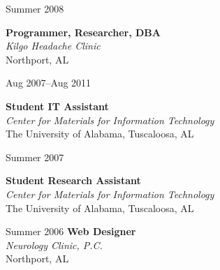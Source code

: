\documentclass[11pt]{simplecv}
\newcommand{\stitle}{\textbf}
\newcommand{\splace}{\textit}
\newif\ifcv
\begin{document}
\begin{topic}
{\ifcv
	\begin{itemize}
		\item Organized weeklong game development workshop.
	\end{itemize}
\fi
}


\item[Summer 2008] {  
  \stitle{Programmer, Researcher, DBA} \\
  \splace{Kilgo Headache Clinic} \\
  Northport, AL

\ifcv
  \begin{itemize}
    \item Managed MySQL database for research data.
    \item Created Java-based data entry client.
    \item Performed data entry.
  \end{itemize}
\fi
}

\item[Aug 2007--Aug 2011] {
  \stitle{Student IT Assistant} \\
  \splace{Center for Materials for Information Technology} \\
  The University of Alabama, Tuscaloosa, AL

\ifcv
  \begin{itemize}
    \item Managed Linux-based services.
    \item Created software solutions for IT problems.
    \item Improved many processes.
  \end{itemize}
\fi
}

\item[Summer 2007] {
  \stitle{Student Research Assistant} \\
  \splace{Center for Materials for Information Technology}  \\
  The University of Alabama, Tuscaloosa, AL

\ifcv
  \begin{itemize}
    \item Conducted research in magnetics.
    \item Created equipment documentation project.
  \end{itemize}
\fi
}

\item[Summer 2006] {
	\stitle{Web Designer} \\
	\splace{Neurology Clinic, P.C.} \\
	Northport, AL
}

\ifcv
	\item[Summer 2004] {
		\stitle{Intern} \\
		\splace{Tuscom Computer Solutions} \\
		Tuscaloosa, AL
	}
\fi

\end{topic}
\end{document}
